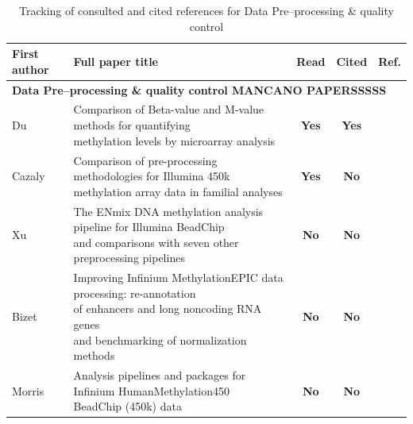 \documentclass[10pt]{extarticle}
\newcommand{\yes}{\cellcolor{yesgreen}\textbf{Yes}}
\newcommand{\noo}{\cellcolor{nored}\textbf{No}}
\begin{document}
\begin{table}[H]
    \centering
    \caption{Tracking of consulted and cited references for Data Pre--processing \& quality control}
    \label{tab:biblio-tracking}

    \begin{tabular}{|l|l|c|c|c|}
        \hline
        \textbf{First author} &
        \textbf{Full paper title} &
        \textbf{Read} &
        \textbf{Cited} &
        \textbf{Ref.} \\
        \hline
	\multicolumn{5}{|l|}{\cellcolor{catbg}\textbf{Data Pre--processing \& quality control MANCANO PAPERSSSSS}} \\
	\hline

	Du &
	\makecell[l]{Comparison of Beta-value and M-value methods for quantifying\\ methylation levels by microarray analysis} &
	\yes & \yes & \cite{Du2010} \\
	\hline

	Cazaly &
	\makecell[l]{Comparison of pre-processing methodologies for Illumina 450k\\ methylation  array data in familial analyses} &
	\yes & \noo & \cite{Cazaly2016} \\
	\hline

    Xu &
	\makecell[l]{The ENmix DNA methylation analysis pipeline for Illumina BeadChip\\ and comparisons with seven other preprocessing pipelines} &
	\noo & \noo & \cite{Xu2021} \\
	\hline

    Bizet &
	\makecell[l]{Improving Infinium MethylationEPIC data processing: re-annotation\\ of enhancers and long noncoding RNA genes\\ and benchmarking of normalization methods} &
	\noo & \noo & \cite{Bizet2022} \\
	\hline

    Morris &
	\makecell[l]{Analysis pipelines and packages for Infinium HumanMethylation450\\ BeadChip (450k) data} &
	\noo & \noo & \cite{Morris2014} \\
	\hline

    \end{tabular}
\end{table}



\printbibliography
\end{document}
